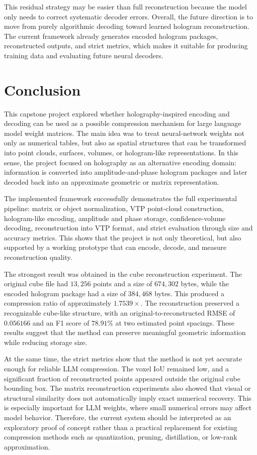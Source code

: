 \documentclass{article}
\begin{document}
\begin{normalsize}
This residual strategy may be easier than full reconstruction because the model only needs to correct systematic decoder errors. Overall, the future direction is to move from purely algorithmic decoding toward learned hologram reconstruction. The current framework already generates encoded hologram packages, reconstructed outputs, and strict metrics, which makes it suitable for producing training data and evaluating future neural decoders.

\section{Conclusion}

This capstone project explored whether holography-inspired encoding and decoding can be used as a possible compression mechanism for large language model weight matrices. The main idea was to treat neural-network weights not only as numerical tables, but also as spatial structures that can be transformed into point clouds, surfaces, volumes, or hologram-like representations. In this sense, the project focused on holography as an alternative encoding domain: information is converted into amplitude-and-phase hologram packages and later decoded back into an approximate geometric or matrix representation.

The implemented framework successfully demonstrates the full experimental pipeline: matrix or object normalization, VTP point-cloud construction, hologram-like encoding, amplitude and phase storage, confidence-volume decoding, reconstruction into VTP format, and strict evaluation through size and accuracy metrics. This shows that the project is not only theoretical, but also supported by a working prototype that can encode, decode, and measure reconstruction quality.

The strongest result was obtained in the cube reconstruction experiment. The original cube file had \(13,256\) points and a size of \(674,302\) bytes, while the encoded hologram package had a size of \(384,468\) bytes. This produced a compression ratio of approximately \(1.7539\times\). The reconstruction preserved a recognizable cube-like structure, with an original-to-reconstructed RMSE of \(0.056166\) and an F1 score of \(78.91\%\) at two estimated point spacings. These results suggest that the method can preserve meaningful geometric information while reducing storage size.

At the same time, the strict metrics show that the method is not yet accurate enough for reliable LLM compression. The voxel IoU remained low, and a significant fraction of reconstructed points appeared outside the original cube bounding box. The matrix reconstruction experiments also showed that visual or structural similarity does not automatically imply exact numerical recovery. This is especially important for LLM weights, where small numerical errors may affect model behavior. Therefore, the current system should be interpreted as an exploratory proof of concept rather than a practical replacement for existing compression methods such as quantization, pruning, distillation, or low-rank approximation.


\end{normalsize}
\end{document}
